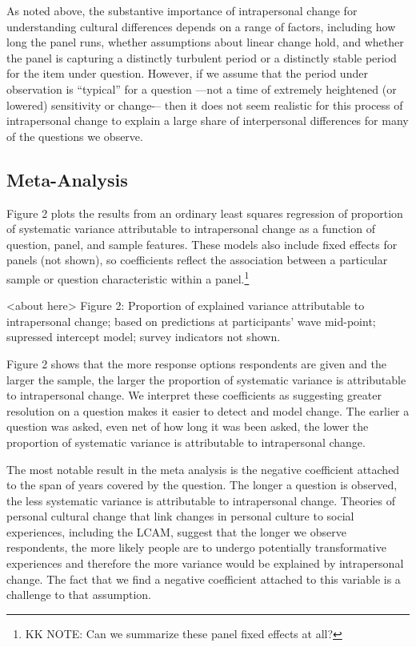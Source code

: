 \documentclass[
  11pt,
]{article}
\begin{document}
As noted above, the substantive importance of intrapersonal change for
understanding cultural differences depends on a range of factors,
including how long the panel runs, whether assumptions about linear
change hold, and whether the panel is capturing a distinctly turbulent
period or a distinctly stable period for the item under question.
However, if we assume that the period under observation is ``typical''
for a question ---not a time of extremely heightened (or lowered)
sensitivity or change-\/-- then it does not seem realistic for this
process of intrapersonal change to explain a large share of
interpersonal differences for many of the questions we observe.

\hypertarget{meta-analysis}{%
\subsection{Meta-Analysis}\label{meta-analysis}}

Figure 2 plots the results from an ordinary least squares regression of
proportion of systematic variance attributable to intrapersonal change
as a function of question, panel, and sample features. These models also
include fixed effects for panels (not shown), so coefficients reflect
the association between a particular sample or question characteristic
within a panel.\footnote{KK NOTE: Can we summarize these panel fixed
  effects at all?}

\begin{center}
<about here>
Figure 2: Proportion of explained variance attributable to intrapersonal change; based on predictions at participants' wave mid-point; supressed intercept model; survey indicators not shown.
\end{center}

Figure 2 shows that the more response options respondents are given and
the larger the sample, the larger the proportion of systematic variance
is attributable to intrapersonal change. We interpret these coefficients
as suggesting greater resolution on a question makes it easier to detect
and model change. The earlier a question was asked, even net of how long
it was been asked, the lower the proportion of systematic variance is
attributable to intrapersonal change.

The most notable result in the meta analysis is the negative coefficient
attached to the span of years covered by the question. The longer a
question is observed, the less systematic variance is attributable to
intrapersonal change. Theories of personal cultural change that link
changes in personal culture to social experiences, including the LCAM,
suggest that the longer we observe respondents, the more likely people
are to undergo potentially transformative experiences and therefore the
more variance would be explained by intrapersonal change. The fact that
we find a negative coefficient attached to this variable is a challenge
to that assumption.
\end{document}

